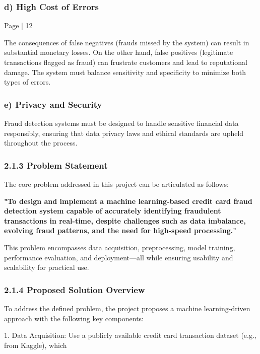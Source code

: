 \documentclass[11pt,a4paper]{article}
\begin{document}
\subsubsection*{d) High Cost of Errors }

Page | 12  

\newpage

The consequences of false negatives (frauds missed by the system) can result in substantial monetary losses. 
On the other hand, false positives (legitimate transactions flagged as fraud) can frustrate customers and lead 
to reputational damage. The system must balance sensitivity and specificity to minimize both types of errors. 

\subsubsection*{e) Privacy and Security }

Fraud detection systems must be designed to handle sensitive financial data responsibly, ensuring that data 
privacy laws and ethical standards are upheld throughout the process. 

\subsubsection*{2.1.3 Problem Statement }

The core problem addressed in this project can be articulated as follows: 

\textbf{"To design and implement a machine learning-based credit card fraud detection system capable of 
accurately identifying fraudulent transactions in real-time, despite challenges such as data imbalance, 
evolving fraud patterns, and the need for high-speed processing." }

This problem encompasses data acquisition, preprocessing, model training, performance evaluation, and 
deployment—all while ensuring usability and scalability for practical use. 

\subsubsection*{2.1.4 Proposed Solution Overview }

To address the defined problem, the project proposes a machine learning-driven approach with the following 
key components: 

1. Data Acquisition: Use a publicly available credit card transaction dataset (e.g., from Kaggle), which 
\end{document}
